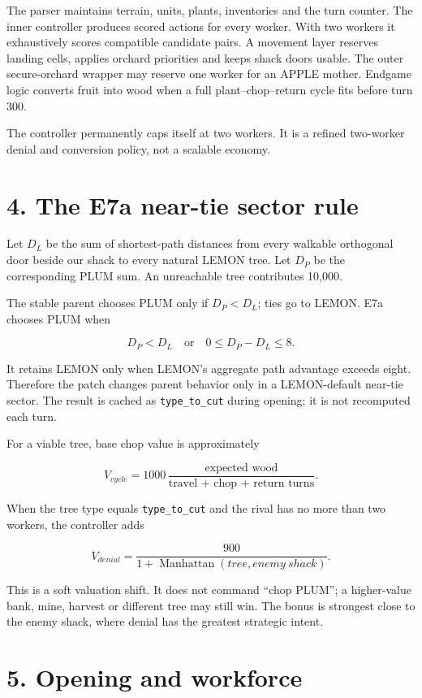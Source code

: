 \documentclass[10pt,a4paper]{article}
\begin{document}
The parser maintains terrain, units, plants, inventories and the turn counter. The inner
controller produces scored actions for every worker. With two workers it exhaustively
scores compatible candidate pairs. A movement layer reserves landing cells, applies
orchard priorities and keeps shack doors usable. The outer secure-orchard wrapper may
reserve one worker for an APPLE mother. Endgame logic converts fruit into wood when a full
plant--chop--return cycle fits before turn 300.

The controller permanently caps itself at two workers. It is a refined two-worker denial
and conversion policy, not a scalable economy.

\section*{4. The E7a near-tie sector rule}

Let $D_L$ be the sum of shortest-path distances from every walkable orthogonal door beside
our shack to every natural LEMON tree. Let $D_P$ be the corresponding PLUM sum. An
unreachable tree contributes 10,000.

The stable parent chooses PLUM only if $D_P < D_L$; ties go to LEMON. E7a chooses PLUM when

\[
  D_P < D_L \quad\text{or}\quad 0 \le D_P-D_L \le 8.
\]

It retains LEMON only when LEMON's aggregate path advantage exceeds eight. Therefore the
patch changes parent behavior only in a LEMON-default near-tie sector. The result is cached
as \texttt{type\_to\_cut} during opening; it is not recomputed each turn.

For a viable tree, base chop value is approximately

\[
  V_{cycle}=1000\,\frac{\text{expected wood}}{\text{travel + chop + return turns}}.
\]

When the tree type equals \texttt{type\_to\_cut} and the rival has no more than two
workers, the controller adds

\[
  V_{denial}=\frac{900}{1+\operatorname{Manhattan}(tree,enemy\ shack)}.
\]

This is a soft valuation shift. It does not command ``chop PLUM''; a higher-value bank,
mine, harvest or different tree may still win. The bonus is strongest close to the enemy
shack, where denial has the greatest strategic intent.

\section*{5. Opening and workforce}
\end{document}

